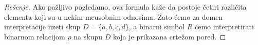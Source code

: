 \noindent
\begin{minipage}{3in}
\begin{proof}[Re\v senje]
  Ako pa\v zljivo pogledamo, ova formula ka\v ze da postoje \v cetiri razli\v cita elementa koji su
  u nekim me\dj usobnim odnosima. Zato \'cemo za domen interpretacije uzeti skup
  $D = \{a, b, c, d\}$, a binarni simbol $R$ \'cemo interpretirati binarnom relacijom
  $\rho$ na skupu $D$ koja je prikazana crte\v zom pored.
\end{proof}
\end{minipage}
\hfill
\begin{minipage}{2.5in}
  \begin{center}
    
  \end{center}
\end{minipage}






%     

